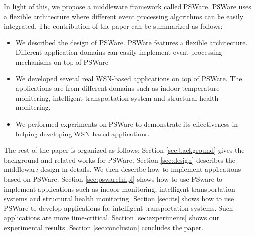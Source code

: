 In light of this, we propose a middleware framework called PSWare. PSWare uses a flexible architecture where different event processing algorithms can be easily integrated. The contribution of the paper can be summarized as follows:
\begin{itemize}
\item We described the design of PSWare. PSWare features a flexible architecture. Different application domains can easily implement event processing mechanisms on top of PSWare.
\item We developed several real WSN-based applications on top of PSWare. The applications are from different domains such as indoor temperature monitoring, intelligent transportation system and structural health monitoring.
\item We performed experiments on PSWare to demonstrate its effectiveness in helping developing WSN-based applications. 
\end{itemize}

The rest of the paper is organized as follows: Section \ref{sec:background} gives the background and related works for PSWare. Section \ref{sec:design} describes the middleware design in details. We then describe how to implement applications based on PSWare. Section \ref{sec:pswareImpl} shows how to use PSware to implement applications such as indoor monitoring, intelligent transportation systems and structural health monitoring. Section \ref{sec:its} shows how to use PSWare to develop applications for intelligent transportation systems. Such applications are more time-critical. Section \ref{sec:experiments} shows our experimental results. Section \ref{sec:conclusion} concludes the paper.